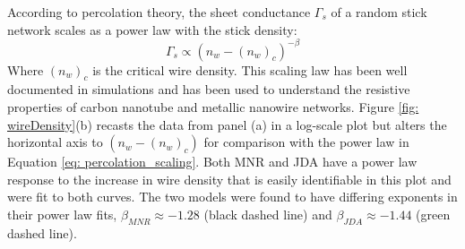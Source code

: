 According to percolation theory, the sheet conductance $\Gamma_s$ of a random stick network scales as a power law with the stick density:
\begin{equation}
\Gamma_s \propto (n_w - (n_w)_c)^{-\beta}
\label{eq: percolation_scaling}
\end{equation}
Where $(n_w)_c$ is the critical wire density. This scaling law has been well documented in simulations\cite{pike1974,li2009,zezelj2012} and has been used to understand the resistive properties of carbon nanotube and metallic nanowire networks\cite{hu2004,bergin2012}. Figure \ref{fig: wireDensity}(b) recasts the data from panel (a) in a log-scale plot but alters the horizontal axis to $(n_w - (n_w)_c)$ for comparison with the power law in Equation \ref{eq: percolation_scaling}. Both MNR and JDA have a power law response to the increase in wire density that is easily identifiable in this plot and were fit to both curves. The two models were found to have differing exponents in their power law fits, $\beta_{MNR}\approx -1.28$ (black dashed line) and $\beta_{JDA}\approx -1.44$ (green dashed line). 

